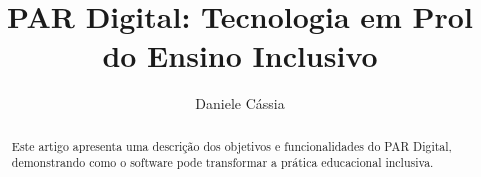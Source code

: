 \documentclass[sigconf]{webmedia}
\begin{document}
\title{PAR Digital: Tecnologia em Prol do Ensino Inclusivo}



\author{Daniele Cássia}

\vspace{1cm}







\begin{abstract}
  Este artigo apresenta uma descrição dos objetivos e funcionalidades do
  PAR Digital, demonstrando como o software pode transformar a prática
  educacional inclusiva.
\end{abstract}



\end{document}
